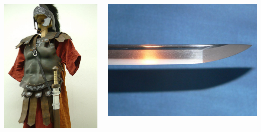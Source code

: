 \documentclass[xcolor=table,serif]{beamer}
\begin{document}
\begin{frame}
\begin{columns}
	\centerline{\includegraphics[scale=0.09]{roman_armour.jpg}}
	\pause
	\centerline{\includegraphics[scale=0.08]{katana.jpg}}

\end{columns}
\end{frame}
\end{document}
